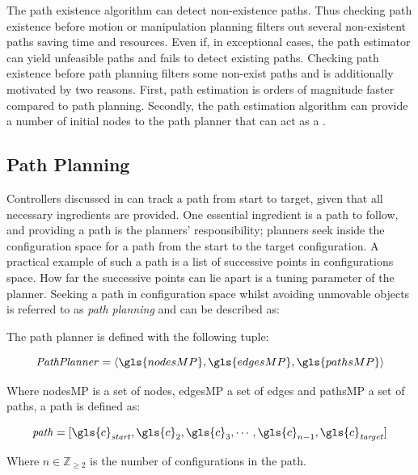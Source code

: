 The path existence algorithm can detect non-existence paths. Thus checking path existence before motion or manipulation planning filters out several non-existent paths saving time and resources. Even if, in exceptional cases, the path estimator can yield unfeasible paths and fails to detect existing paths. Checking path existence before path planning filters some non-exist paths and is additionally motivated by two reasons. First, path estimation is orders of magnitude faster compared to path planning. Secondly, the path estimation algorithm can provide a number of initial nodes to the path planner that can act as a .


\subsection{Path Planning}%
\label{subsec:path_planning}
Controllers discussed in  can track a path from start to target, given that all necessary ingredients are provided. One essential ingredient is a path to follow, and providing a path is the planners' responsibility; planners seek inside the configuration space for a path from the start to the target configuration. A practical example of such a path is a list of successive points in configurations space. How far the successive points can lie apart is a tuning parameter of the planner. Seeking a path in configuration space whilst avoiding unmovable objects is referred to as \textit{path planning} and can be described as:\bs

\textit{}\bs

The path planner is defined with the following tuple:

\[\mathit{Path Planner} = \left\langle \gls{nodesMP}, \gls{edgesMP}, \gls{pathsMP}\right\rangle\]

Where \gls{nodesMP} is a set of nodes, \gls{edgesMP} a set of edges and \gls{pathsMP} a set of paths, a path is defined as:

\[\mathit{path} = [\gls{c}_\mathit{start}, \gls{c}_2, \gls{c}_3, \cdots, \gls{c}_{n-1}, \gls{c}_\mathit{target}]\]

Where $n \in \mathbb{Z}_{\geq 2}$ is the number of configurations in the path.\bs

